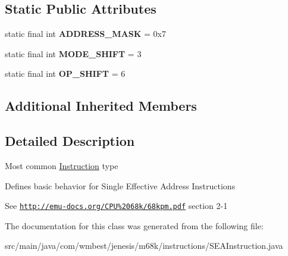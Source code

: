 \subsection*{Static Public Attributes}
\begin{DoxyCompactItemize}
\item 
\hypertarget{classcom_1_1wmbest_1_1jenesis_1_1m68k_1_1instructions_1_1SEAInstruction_ad369b8db0254823f299199a3371d6d59}{static final int {\bfseries A\-D\-D\-R\-E\-S\-S\-\_\-\-M\-A\-S\-K} = 0x7}\label{classcom_1_1wmbest_1_1jenesis_1_1m68k_1_1instructions_1_1SEAInstruction_ad369b8db0254823f299199a3371d6d59}

\item 
\hypertarget{classcom_1_1wmbest_1_1jenesis_1_1m68k_1_1instructions_1_1SEAInstruction_aadf883dfbf4cf8e0f68161616cfb33e2}{static final int {\bfseries M\-O\-D\-E\-\_\-\-S\-H\-I\-F\-T} = 3}\label{classcom_1_1wmbest_1_1jenesis_1_1m68k_1_1instructions_1_1SEAInstruction_aadf883dfbf4cf8e0f68161616cfb33e2}

\item 
\hypertarget{classcom_1_1wmbest_1_1jenesis_1_1m68k_1_1instructions_1_1SEAInstruction_ac76dc03f73e6ed7eb027b4a58f178ac4}{static final int {\bfseries O\-P\-\_\-\-S\-H\-I\-F\-T} = 6}\label{classcom_1_1wmbest_1_1jenesis_1_1m68k_1_1instructions_1_1SEAInstruction_ac76dc03f73e6ed7eb027b4a58f178ac4}

\end{DoxyCompactItemize}
\subsection*{Additional Inherited Members}


\subsection{Detailed Description}
Most common \hyperlink{classcom_1_1wmbest_1_1jenesis_1_1m68k_1_1instructions_1_1Instruction}{Instruction} type

Defines basic behavior for Single Effective Address Instructions

See \href{http://emu-docs.org/CPU%2068k/68kpm.pdf}{\tt http\-://emu-\/docs.\-org/\-C\-P\-U\%2068k/68kpm.\-pdf} section 2-\/1 

The documentation for this class was generated from the following file\-:\begin{DoxyCompactItemize}
\item 
src/main/java/com/wmbest/jenesis/m68k/instructions/S\-E\-A\-Instruction.\-java\end{DoxyCompactItemize}
